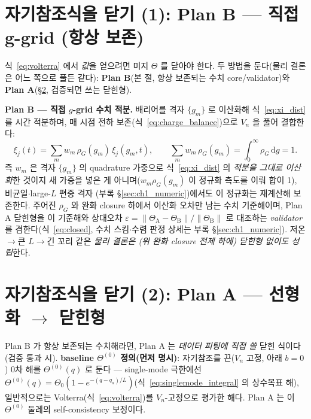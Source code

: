 \documentclass[11pt,a4paper]{article}
\newcommand{\dd}{\mathrm{d}}
\begin{document}
\section{자기참조식을 닫기 (1): Plan B — 직접 g-grid (항상 보존)}\label{sec:planB}
식~\eqref{eq:volterra} 에서 \emph{값}을 얻으려면 미지 $\Theta$ 를 닫아야 한다. 두 방법을 둔다(물리 결론은 어느
쪽으로 풀든 같다): \textbf{Plan B}(본 절, 항상 보존되는 수치 core/validator)와 \textbf{Plan A}(\S\ref{sec:planA},
검증되면 쓰는 닫힌형).

\textbf{Plan B — 직접 $g$-grid 수치 적분.} 배리어를 격자 $\{g_m\}$ 로 이산화해
식~\eqref{eq:xi_dist} 를 시간 적분하며, 매 시점 전하 보존(식~\eqref{eq:charge_balance})으로 $V_n$ 을 풀어 결합한다:
\begin{equation*}
\xi_j(t)=\sum_m w_m\,\rho_G(g_m)\,\xi_j(g_m,t),\qquad \sum_m w_m\,\rho_G(g_m)=\int_0^\infty\rho_G\,\dd g=1.
\end{equation*}
즉 $w_m$ 은 격자 $\{g_m\}$ 의 quadrature 가중으로 식~\eqref{eq:xi_dist} 의 \emph{적분을 그대로 이산화}한 것이지
새 가중을 넣은 게 아니며($w_m\rho_G(g_m)$ 이 정규화 측도를 이뤄 합이 1), 비균일$\cdot$large-$L$ 편중 격자
(부록 \S\ref{sec:ch1_numeric})에서도 이 정규화는 재계산해 보존한다. 주어진 $\rho_G$ 와 완화 closure 하에서
이산화 오차만 남는 수치 기준해이며, Plan A 닫힌형을 이 기준해와 상대오차
$\varepsilon=\lVert\Theta_\mathrm A-\Theta_\mathrm B\rVert/\lVert\Theta_\mathrm B\rVert$ 로 대조하는 \emph{validator}
를 겸한다(식~\eqref{eq:closed}, 수치 스킴$\cdot$수렴 판정 상세는 부록 \S\ref{sec:ch1_numeric}). 저온$\to$큰
$L$$\to$긴 꼬리 같은 \emph{물리 결론은 (위 완화 closure 전제 하에) 닫힌형 없이도 성립}한다.

\section{자기참조식을 닫기 (2): Plan A — 선형화 $\to$ 닫힌형}\label{sec:planA}
Plan B 가 항상 보존되는 수치해라면, Plan A 는 \emph{데이터 피팅에 직접 쓸} 닫힌 식이다(검증 통과 시). \textbf{baseline
$\Theta^{(0)}$ 정의(먼저 명시)}: 자기참조를 끈($V_n$ 고정, 아래 $b=0$) 0차 해를 $\Theta^{(0)}(q)$ 로 둔다 —
single-mode 극한에선 $\Theta^{(0)}(q)=\Theta_0(1-e^{-(q-q_a)/L})$(식~\eqref{eq:singlemode_integral} 의 상수목표
해), 일반적으로는 Volterra(식~\eqref{eq:volterra})를 $V_n$-고정으로 평가한 해다. Plan A 는 이 $\Theta^{(0)}$ 둘레의
self-consistency 보정이다.
\end{document}
